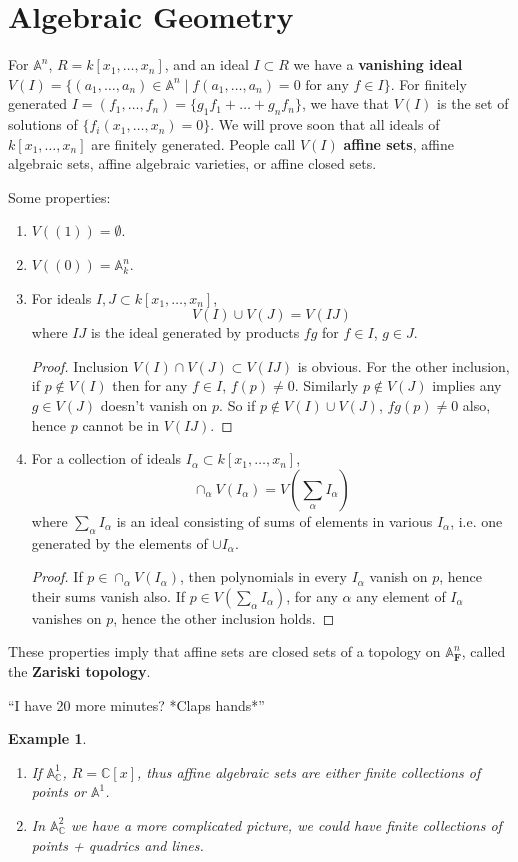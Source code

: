 \documentclass[12pt]{article}
\newcommand{\F}{\mathbf{F}}
\newcommand{\C}{\mathbb{C}}
\newcommand{\A}{\mathbb{A}}
\newtheorem*{example}{Example}
\begin{document}
\section{Algebraic Geometry}
    For $\A^n$, $R = k[x_1, \dots, x_n]$, and an ideal $I \subset R$ we have a \textbf{vanishing ideal} $V(I) = \{(a_1, \dots, a_n) \in \A^n \mid f(a_1, \dots, a_n) = 0 \text{ for any } f \in I\}$. For finitely generated $I = (f_1,\dots, f_n) = \{g_1f_1 + \dots + g_nf_n\}$, we have that $V(I)$ is the set of solutions of $\{f_i(x_1, \dots, x_n) = 0\}$. We will prove soon that all ideals of $k[x_1, \dots, x_n]$ are finitely generated. People call $V(I)$ \textbf{affine sets}, affine algebraic sets, affine algebraic varieties, or affine closed sets. \par
    Some properties:
    \begin{enumerate}
        \item $V((1)) = \emptyset$.
        \item $V((0)) = \A^n_k$.
        \item For ideals $I, J \subset k[x_1, \dots, x_n]$,
        $$V(I) \cup V(J) = V(IJ)$$
        where $IJ$ is the ideal generated by products $fg$ for $f \in I$, $g \in J$.
        \begin{proof}
            Inclusion $V(I) \cap V(J) \subset V(IJ)$ is obvious. For the other inclusion, if $p \not \in V(I)$ then for any $f \in I$, $f(p) \neq 0$. Similarly $p \not \in V(J)$ implies any $g \in V(J)$ doesn't vanish on $p$. So if $p \not \in V(I) \cup V(J)$, $fg(p) \neq 0$ also, hence $p$ cannot be in $V(IJ)$.
        \end{proof}
        \item For a collection of ideals $I_\alpha \subset k[x_1, \dots, x_n]$,
        $$\cap_\alpha V(I_\alpha) = V(\sum_\alpha I_\alpha)$$
        where $\sum_\alpha I_\alpha$ is an ideal consisting of sums of elements in various $I_\alpha$, i.e. one generated by the elements of $\cup I_\alpha$.
        \begin{proof}
            If $p \in \cap_\alpha V(I_\alpha)$, then polynomials in every $I_\alpha$ vanish on $p$, hence their sums vanish also. If $p \in V(\sum_\alpha I_\alpha)$, for any $\alpha$ any element of $I_\alpha$ vanishes on $p$, hence the other inclusion holds.
        \end{proof}
    \end{enumerate}
    These properties imply that affine sets are closed sets of a topology on $\A^n_\F$, called the \textbf{Zariski topology}. \par
    ``I have 20 more minutes? *Claps hands*''\par
    \begin{example}
        \begin{enumerate}
            \item If $\A_\C^1$, $R = \C[x]$, thus affine algebraic sets are either finite collections of points or $\A^1$.
            \item In $\A^2_\C$ we have a more complicated picture, we could have finite collections of points + quadrics and lines.
        \end{enumerate}
    \end{example}
\end{document}
